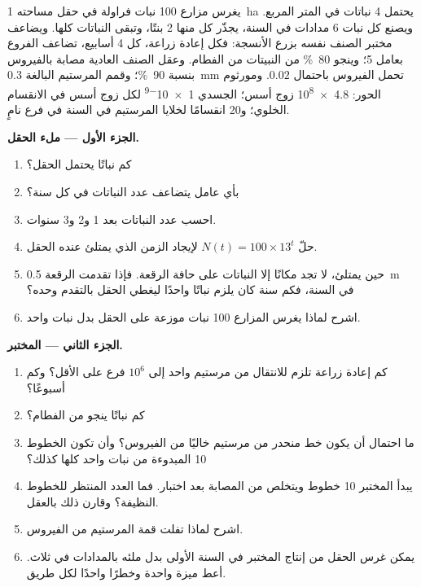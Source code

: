 \begin{problem}
\label{pb:b2:asexual-reproduction:1}
يغرس مزارع \num{100} نبات فراولة في حقل مساحته
\qty{1}{ha} يحتمل \num{4} نباتات في المتر المربع. ويصنع كل
نبات \num{6} مدادات في السنة، يجذّر كل منها \num{2} بنتًا،
وتبقى النباتات كلها. ويضاعف مختبر الصنف نفسه بزرع
الأنسجة: فكل إعادة زراعة، كل \num{4} أسابيع، تضاعف
الفروع بعامل \num{5}؛ وينجو \qty{80}{\%} من النبيتات من الفطام.
وعقل الصنف العادية مصابة بالفيروس بنسبة \qty{90}{\%}؛
وقمم المرستيم البالغة \qty{0.3}{mm} تحمل الفيروس باحتمال
$0.02$. ومورثوم الحور: \qty{4.8e8}{} زوج أسس؛  الجسدي
\qty{1e-9}{} لكل زوج أسس في الانقسام الخلوي؛ و\num{20} انقسامًا
لخلايا المرستيم في السنة في فرع نامٍ.

\medskip
\noindent\textbf{الجزء الأول --- ملء الحقل.}
\begin{enumerate}
  \item كم نباتًا يحتمل الحقل؟
  \item بأي عامل يتضاعف عدد النباتات في كل سنة؟
  \item احسب عدد النباتات بعد 1 و2 و3 سنوات.
  \item حلّ $N(t) = 100\times 13^{t}$ لإيجاد الزمن الذي يمتلئ عنده
        الحقل.
  \item حين يمتلئ، لا تجد مكانًا إلا النباتات على حافة الرقعة.
        فإذا تقدمت الرقعة \qty{0.5}{m} في السنة، فكم سنة كان يلزم
        نباتًا واحدًا ليغطي الحقل بالتقدم وحده؟
  \item اشرح لماذا يغرس المزارع \num{100} نبات موزعة على الحقل
        بدل نبات واحد.
\end{enumerate}

\medskip
\noindent\textbf{الجزء الثاني --- المختبر.}
\begin{enumerate}[resume]
  \item كم إعادة زراعة تلزم للانتقال من مرستيم واحد إلى
        $10^{6}$ فرع على الأقل؟ وكم أسبوعًا؟
  \item كم نباتًا ينجو من الفطام؟
  \item ما احتمال أن يكون خط منحدر من مرستيم خاليًا من الفيروس؟
        وأن تكون الخطوط \num{10} المبدوءة من نبات واحد كلها كذلك؟
  \item يبدأ المختبر \num{10} خطوط ويتخلص من المصابة بعد اختبار.
        فما العدد المنتظر للخطوط النظيفة؟ وقارن ذلك بالعقل.
  \item اشرح لماذا تفلت قمة المرستيم من الفيروس.
  \item يمكن غرس الحقل من إنتاج المختبر في السنة الأولى بدل ملئه
        بالمدادات في ثلاث. أعط ميزة واحدة وخطرًا واحدًا لكل طريق.
\end{enumerate}


\end{problem}
